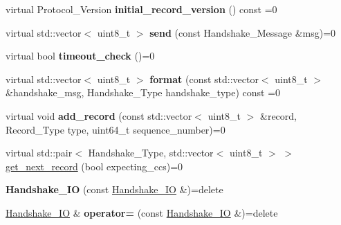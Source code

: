 \begin{DoxyCompactItemize}
\item 
\mbox{\label{class_botan_1_1_t_l_s_1_1_handshake___i_o_a9ae3a09cf8928062cc1f847b474bf88e}} 
virtual Protocol\+\_\+\+Version {\bfseries initial\+\_\+record\+\_\+version} () const =0
\item 
\mbox{\label{class_botan_1_1_t_l_s_1_1_handshake___i_o_a0a69d60379fe1159fd0adee8a00217ed}} 
virtual std\+::vector$<$ uint8\+\_\+t $>$ {\bfseries send} (const Handshake\+\_\+\+Message \&msg)=0
\item 
\mbox{\label{class_botan_1_1_t_l_s_1_1_handshake___i_o_a2c5e39be0c330fb729f122c75d0d5d1f}} 
virtual bool {\bfseries timeout\+\_\+check} ()=0
\item 
\mbox{\label{class_botan_1_1_t_l_s_1_1_handshake___i_o_a797a98cb57551d5194e12dad7f2bc3ff}} 
virtual std\+::vector$<$ uint8\+\_\+t $>$ {\bfseries format} (const std\+::vector$<$ uint8\+\_\+t $>$ \&handshake\+\_\+msg, Handshake\+\_\+\+Type handshake\+\_\+type) const =0
\item 
\mbox{\label{class_botan_1_1_t_l_s_1_1_handshake___i_o_a348ecce2ce6aa46c5e5c2d3790a25ef4}} 
virtual void {\bfseries add\+\_\+record} (const std\+::vector$<$ uint8\+\_\+t $>$ \&record, Record\+\_\+\+Type type, uint64\+\_\+t sequence\+\_\+number)=0
\item 
virtual std\+::pair$<$ Handshake\+\_\+\+Type, std\+::vector$<$ uint8\+\_\+t $>$ $>$ \mbox{\hyperlink{class_botan_1_1_t_l_s_1_1_handshake___i_o_a3ebecdb050cb44831453dda8498373a8}{get\+\_\+next\+\_\+record}} (bool expecting\+\_\+ccs)=0
\item 
\mbox{\label{class_botan_1_1_t_l_s_1_1_handshake___i_o_a0c65724131c7d977f6863c9e13f8402b}} 
{\bfseries Handshake\+\_\+\+IO} (const \mbox{\hyperlink{class_botan_1_1_t_l_s_1_1_handshake___i_o}{Handshake\+\_\+\+IO}} \&)=delete
\item 
\mbox{\label{class_botan_1_1_t_l_s_1_1_handshake___i_o_af7e1c690f71715b7551993d7367d5b33}} 
\mbox{\hyperlink{class_botan_1_1_t_l_s_1_1_handshake___i_o}{Handshake\+\_\+\+IO}} \& {\bfseries operator=} (const \mbox{\hyperlink{class_botan_1_1_t_l_s_1_1_handshake___i_o}{Handshake\+\_\+\+IO}} \&)=delete
\end{DoxyCompactItemize}


